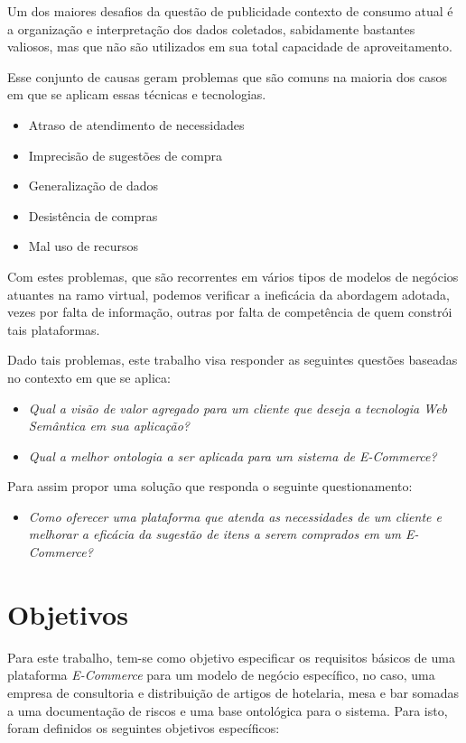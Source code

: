 Um dos maiores desafios da questão de publicidade contexto de consumo atual é a organização e interpretação dos dados coletados, sabidamente bastantes valiosos, mas que não são utilizados em sua total capacidade de aproveitamento\cite{zamanzadeh:2013}.

Esse conjunto de causas geram problemas que são comuns na maioria dos casos em que se aplicam essas técnicas e tecnologias.

\begin{itemize}
\item Atraso de atendimento de necessidades
\item Imprecisão de sugestões de compra
\item Generalização de dados
\item Desistência de compras
\item Mal uso de recursos
\end{itemize}

Com estes problemas, que são recorrentes em vários tipos de modelos de negócios atuantes na ramo virtual, podemos verificar a ineficácia da abordagem adotada, vezes por falta de informação, outras por falta de competência de quem constrói tais plataformas.

	Dado tais problemas, este trabalho visa responder as seguintes questões baseadas no contexto em que se aplica:

	\begin{itemize}
	\item{\textit{Qual a visão de valor agregado para um cliente que deseja a tecnologia Web Semântica em sua aplicação?}}
	\item{\textit{Qual a melhor ontologia a ser aplicada para um sistema de E-Commerce?}}
	\end{itemize}

	Para assim propor uma solução que responda o seguinte questionamento:
	\begin{itemize}
	\item{\textit{Como oferecer uma plataforma que atenda as necessidades de um cliente e melhorar a eficácia da sugestão de itens a serem comprados em um E-Commerce?}}
	\end{itemize}

\section{Objetivos}

Para este trabalho, tem-se como objetivo especificar os requisitos básicos de uma plataforma \textit{E-Commerce} para um modelo de negócio específico, no caso, uma empresa de consultoria e distribuição de artigos de hotelaria, mesa e bar somadas a uma documentação de riscos e uma base ontológica para o sistema. Para isto, foram definidos os seguintes objetivos específicos:

